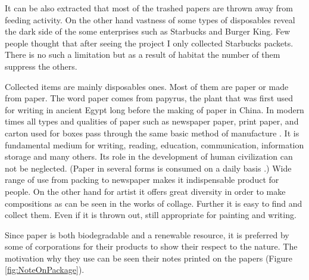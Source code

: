 It can be also extracted that most of the trashed papers are thrown away from feeding activity. On the other hand vastness of some types of disposables reveal the dark side of the some enterprises such as Starbucks and Burger King. Few people thought that after seeing the project I only collected Starbucks packets. There is no such a limitation but as a result of habitat the number of them suppress the others.

Collected items are mainly disposables ones. Most of them are paper or made from paper. The word paper comes from papyrus, the plant that was first used for writing in ancient Egypt long before the making of paper in China. In modern times all types and qualities of paper such as newspaper paper, print paper, and carton used for boxes pass through the same basic method of manufacture \citep{trafford2012paper}. It is fundamental medium for writing, reading, education, communication, information storage and many others. Its role in the development of human civilization can not be neglected. (Paper in several forms is consumed on a daily basis \cite{trafford2012paper}.) Wide range of use from packing to newspaper makes it indispensable product for people. On the other hand for artist it offers great diversity in order to make compositions as can be seen in the works of collage. Further it is easy to find and collect them. Even if it is thrown out, still appropriate for painting and writing.


Since paper is both biodegradable and a renewable resource, it is preferred by some of corporations for their products to show their respect to the nature. The motivation why they use can be seen their notes printed on the papers (Figure \ref{fig:NoteOnPackage}).

